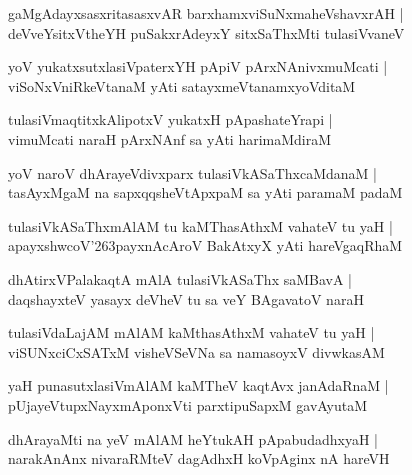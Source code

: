 \begin{shloka}
gaMgAdayxsasxritasasxvAR barxhamxviSuNxmaheVshavxrAH |\\
deVveYsitxVtheYH puSakxrAdeyxY sitxSaThxMti tulasiVvaneV
\end{shloka}

\begin{shloka}
yoV yukatxsutxlasiVpaterxYH pApiV pArxNAnivxmuMcati |\\
viSoNxVniRkeVtanaM yAti satayxmeVtanamxyoVditaM 
\end{shloka}

\begin{shloka}
tulasiVmaqtitxkAlipotxV yukatxH pApashateYrapi |\\
vimuMcati naraH pArxNAnf sa yAti harimaMdiraM 
\end{shloka}

\begin{shloka}
yoV naroV dhArayeVdivxparx tulasiVkASaThxcaMdanaM |\\
tasAyxMgaM na sapxqqsheVtApxpaM sa yAti paramaM padaM 
\end{shloka}

\begin{shloka}
tulasiVkASaThxmAlAM tu kaMThasAthxM vahateV tu yaH |\\
apayxshwcoV\char'263payxnAcAroV BakAtxyX yAti hareVgaqRhaM 
\end{shloka}

\begin{shloka}
dhAtirxVPalakaqtA mAlA tulasiVkASaThx saMBavA |\\
daqshayxteV yasayx deVheV tu sa veY BAgavatoV naraH
\end{shloka}

\begin{shloka}
tulasiVdaLajAM mAlAM kaMthasAthxM vahateV tu yaH |\\
viSUNxciCxSATxM visheVSeVNa sa namasoyxV divwkasAM
\end{shloka}

\begin{shloka}
yaH punasutxlasiVmAlAM kaMTheV kaqtAvx janAdaRnaM |\\
pUjayeVtupxNayxmAponxVti parxtipuSapxM gavAyutaM
\end{shloka}

\begin{shloka}
dhArayaMti na yeV mAlAM heYtukAH pApabudadhxyaH |\\
narakAnAnx nivaraRMteV dagAdhxH koVpAginx nA hareVH
\end{shloka}


